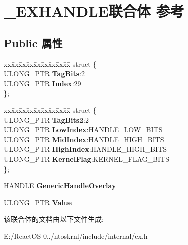 \hypertarget{union___e_x_h_a_n_d_l_e}{}\section{\+\_\+\+E\+X\+H\+A\+N\+D\+L\+E联合体 参考}
\label{union___e_x_h_a_n_d_l_e}
\subsection*{Public 属性}
\begin{DoxyCompactItemize}
\item 
\mbox{\label{union___e_x_h_a_n_d_l_e_ad2fe6fe202ffca6131d24d69bbb630a6}} 
\begin{tabbing}
xx\=xx\=xx\=xx\=xx\=xx\=xx\=xx\=xx\=\kill
struct \{\\
\>ULONG\_PTR {\bfseries TagBits}:2\\
\>ULONG\_PTR {\bfseries Index}:29\\
\}; \\

\end{tabbing}\item 
\mbox{\label{union___e_x_h_a_n_d_l_e_aeae60315c0613ad2753bb20a2e13a053}} 
\begin{tabbing}
xx\=xx\=xx\=xx\=xx\=xx\=xx\=xx\=xx\=\kill
struct \{\\
\>ULONG\_PTR {\bfseries TagBits2}:2\\
\>ULONG\_PTR {\bfseries LowIndex}:HANDLE\_LOW\_BITS\\
\>ULONG\_PTR {\bfseries MidIndex}:HANDLE\_HIGH\_BITS\\
\>ULONG\_PTR {\bfseries HighIndex}:HANDLE\_HIGH\_BITS\\
\>ULONG\_PTR {\bfseries KernelFlag}:KERNEL\_FLAG\_BITS\\
\}; \\

\end{tabbing}\item 
\mbox{\label{union___e_x_h_a_n_d_l_e_a72e5c06495553409272ec2434acf734f}} 
\hyperlink{interfacevoid}{H\+A\+N\+D\+LE} {\bfseries Generic\+Handle\+Overlay}
\item 
\mbox{\label{union___e_x_h_a_n_d_l_e_aa2e00ee138798d66b1ba82a2df7644f2}} 
U\+L\+O\+N\+G\+\_\+\+P\+TR {\bfseries Value}
\end{DoxyCompactItemize}


该联合体的文档由以下文件生成\+:\begin{DoxyCompactItemize}
\item 
E\+:/\+React\+O\+S-\/0../ntoskrnl/include/internal/ex.\+h\end{DoxyCompactItemize}
